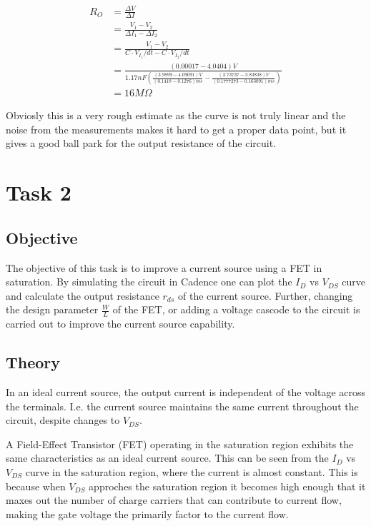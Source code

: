\documentclass[onecolumn]{article}
\begin{document}
\begin{align}
    R_O &= \frac{\Delta V}{\Delta I} \\
        &= \frac{V_1 - V_2}{\Delta I_1 - \Delta I_2}\\
        &= \frac{V_1 - V_2}{C \cdot V_{I_1}/dt - C \cdot V_{I_2}/dt}\\
        &= \frac{(0.00017 - 4.0404)V}{1.17nF(\frac{(3.9899 - 4.09091)V}{(0.1418 - 0.1276)ms} -\frac{(3.73737 - 3.83838)V}{(0.1777273 - 0.163091)ms})}\\
        &= 16M\Omega
\end{align}

Obviosly this is a very rough estimate as the curve is not truly linear and the noise from the measurements makes it hard to get a proper data point, but it gives a good ball park for the output resistance of the circuit.

\section{Task 2}

\subsection{Objective}
The objective of this task is to improve a current source using a FET in saturation. By simulating the circuit in Cadence one can plot the $I_D$ vs $V_{DS}$ curve and calculate the output resistance $r_{ds}$ of the current source. Further, changing the design parameter $\frac{W}{L}$ of the FET, or adding a voltage cascode to the circuit is carried out to improve the current source capability.

\subsection{Theory}

In an ideal current source, the output current is independent of the voltage across the terminals. I.e. the current source maintains the same current throughout the circuit, despite changes to $V_{DS}$.

A Field-Effect Transistor (FET) operating in the saturation region exhibits the same characteristics as an ideal current source. This can be seen from the $I_D$ vs $V_{DS}$ curve in the saturation region, where the current is almost constant. This is because when  $V_{DS}$ approches the saturation region it becomes high enough that it maxes out the number of charge carriers that can contribute to current flow, making the gate voltage the primarily factor to the current flow.
\end{document}
